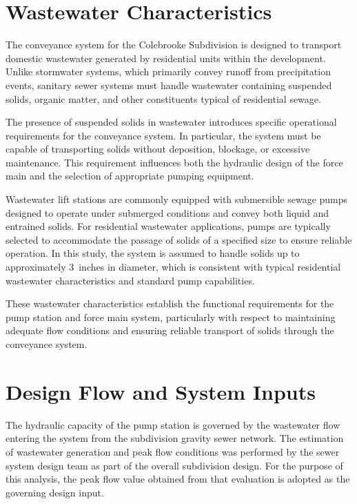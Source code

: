 \section{Wastewater Characteristics}

The conveyance system for the Colebrooke Subdivision is designed to transport domestic wastewater generated by residential units within the development. Unlike stormwater systems, which primarily convey runoff from precipitation events, sanitary sewer systems must handle wastewater containing suspended solids, organic matter, and other constituents typical of residential sewage.

The presence of suspended solids in wastewater introduces specific operational requirements for the conveyance system. In particular, the system must be capable of transporting solids without deposition, blockage, or excessive maintenance. This requirement influences both the hydraulic design of the force main and the selection of appropriate pumping equipment.

Wastewater lift stations are commonly equipped with submersible sewage pumps designed to operate under submerged conditions and convey both liquid and entrained solids. For residential wastewater applications, pumps are typically selected to accommodate the passage of solids of a specified size to ensure reliable operation. In this study, the system is assumed to handle solids up to approximately 3~inches in diameter, which is consistent with typical residential wastewater characteristics and standard pump capabilities.

These wastewater characteristics establish the functional requirements for the pump station and force main system, particularly with respect to maintaining adequate flow conditions and ensuring reliable transport of solids through the conveyance system.



\section{Design Flow and System Inputs}

The hydraulic capacity of the pump station is governed by the wastewater flow entering the system from the subdivision gravity sewer network. The estimation of wastewater generation and peak flow conditions was performed by the sewer system design team as part of the overall subdivision design. For the purpose of this analysis, the peak flow value obtained from that evaluation is adopted as the governing design input.

